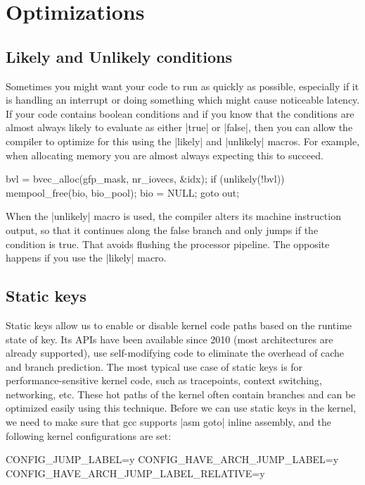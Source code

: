 \documentclass[10pt, oneside]{book}
\begin{document}
\section{Optimizations}
\label{sec:optimization}
\subsection{Likely and Unlikely conditions}
\label{sec:likely_unlikely}
Sometimes you might want your code to run as quickly as possible, especially if it is handling an interrupt or doing something which might cause noticeable latency.
If your code contains boolean conditions and if you know that the conditions are almost always likely to evaluate as either \cpp|true| or \cpp|false|,
then you can allow the compiler to optimize for this using the \cpp|likely| and \cpp|unlikely| macros.
For example, when allocating memory you are almost always expecting this to succeed.

\begin{code}
bvl = bvec_alloc(gfp_mask, nr_iovecs, &idx);
if (unlikely(!bvl)) {
    mempool_free(bio, bio_pool);
    bio = NULL;
    goto out;
}
\end{code}

When the \cpp|unlikely| macro is used, the compiler alters its machine instruction output, so that it continues along the false branch and only jumps if the condition is true.
That avoids flushing the processor pipeline.
The opposite happens if you use the \cpp|likely| macro.

\subsection{Static keys}
\label{sec:static_keys}
Static keys allow us to enable or disable kernel code paths based on the runtime state of key. Its APIs have been available since 2010 (most architectures are already supported), use self-modifying code to eliminate the overhead of cache and branch prediction.
The most typical use case of static keys is for performance-sensitive kernel code, such as tracepoints, context switching, networking, etc. These hot paths of the kernel often contain branches and can be optimized easily using this technique.
Before we can use static keys in the kernel, we need to make sure that gcc supports \cpp|asm goto| inline assembly, and the following kernel configurations are set:

\begin{code}
CONFIG_JUMP_LABEL=y
CONFIG_HAVE_ARCH_JUMP_LABEL=y
CONFIG_HAVE_ARCH_JUMP_LABEL_RELATIVE=y
\end{code}
\end{document}
